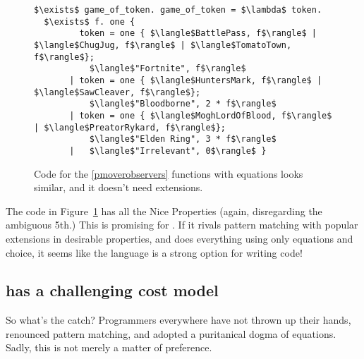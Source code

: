\documentclass[manuscript,screen,review, 12pt, nonacm]{acmart}
\begin{document}
\begin{figure}[ht]
\begin{minipage}[h]{0.5\linewidth}
        \vspace{4ex}
        \end{minipage} 
        \begin{minipage}[h]{\linewidth}
          \verselst
          \begin{lstlisting}[numbers=none, basicstyle=\tiny, xleftmargin=9em, 
                            frame=single, showstringspaces=false]
$\exists$ game_of_token. game_of_token = $\lambda$ token. 
  $\exists$ f. one {
         token = one { $\langle$BattlePass, f$\rangle$ | $\langle$ChugJug, f$\rangle$ | $\langle$TomatoTown, f$\rangle$}; 
           $\langle$"Fortnite", f$\rangle$
       | token = one { $\langle$HuntersMark, f$\rangle$ | $\langle$SawCleaver, f$\rangle$}; 
           $\langle$"Bloodborne", 2 * f$\rangle$
       | token = one { $\langle$MoghLordOfBlood, f$\rangle$ | $\langle$PreatorRykard, f$\rangle$}; 
           $\langle$"Elden Ring", 3 * f$\rangle$
       |   $\langle$"Irrelevant", 0$\rangle$ }
          \end{lstlisting}
            \label{fig:versegot} 
        \vspace{4ex}
        \end{minipage}%
    \caption{Code for the \ref{pmoverobservers} functions with equations looks
    similar, and it doesn't need extensions.}
    \label{fig:verseextfuncs}
      \end{figure}
        
    The code in Figure~\ref{fig:verseextfuncs} has all the Nice Properties
    (again, disregarding the ambiguous 5th.) This is promising for \VC. If it
    rivals pattern matching with popular extensions in desirable properties, and
    \VC does everything using only equations and choice, it seems like the
    language is a strong option for writing code! 

    \subsection{\VC has a challenging cost model}
    \label{vcbadcost}

    So what's the catch? Programmers everywhere have not thrown up their hands,
    renounced pattern matching, and adopted a puritanical dogma of equations. 
    Sadly, this is not merely a matter of preference. 
\end{document}
